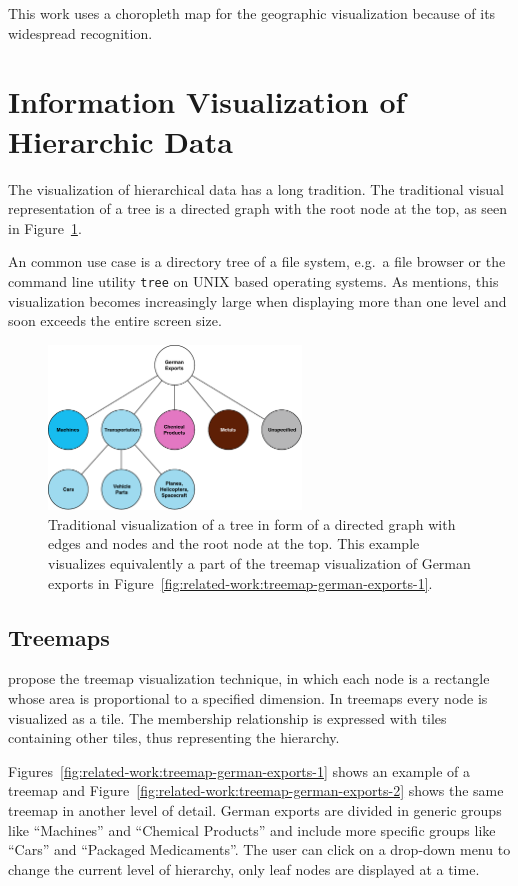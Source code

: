 This work uses a choropleth map for the geographic visualization because of its widespread recognition.

\section{Information Visualization of Hierarchic Data}
The visualization of hierarchical data has a long tradition.
The traditional visual representation of a tree is a directed graph with the root node at the top, as seen in Figure~\ref{fig:related-work:tree-graph}.

An common use case is a directory tree of a file system, e.g.\ a file browser or the command line utility \texttt{tree} on UNIX based operating systems.
As \textcite{Shneiderman1992} mentions, this visualization becomes increasingly large when displaying more than one level and soon exceeds the entire screen size.

\begin{figure}
  \centering
  \includegraphics[width=0.6\textwidth]{figures/related-work/Treegraph}
  \caption{
    Traditional visualization of a tree in form of a directed graph with edges and nodes and the root node at the top.
    This example visualizes equivalently a part of the treemap visualization of German exports in Figure~\ref{fig:related-work:treemap-german-exports-1}.
  }
  \label{fig:related-work:tree-graph}
\end{figure}

\subsection{Treemaps}
\textcite{Johnson1991} propose the treemap visualization technique, in which each node is a rectangle whose area is proportional to a specified dimension.
In treemaps every node is visualized as a tile.
The membership relationship is expressed with tiles containing other tiles, thus representing the hierarchy.

Figures~\ref{fig:related-work:treemap-german-exports-1} shows an example of a treemap and Figure~\ref{fig:related-work:treemap-german-exports-2} shows the same treemap in another level of detail.
German exports are divided in generic groups like ``Machines'' and ``Chemical Products'' and include more specific groups like ``Cars'' and ``Packaged Medicaments''.
The user can click on a drop-down menu to change the current level of hierarchy, only leaf nodes are displayed at a time.


